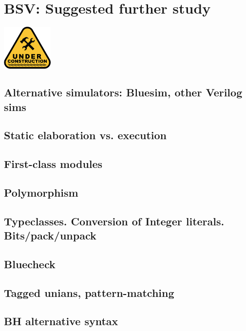 

\chapter{BSV: Suggested further study}


\setcounter{page}{1}
\renewcommand{\thepage}{\arabic{chapter}-\arabic{page}}

\label{ch_BSV_further_study}


\vspace{2ex}

\centerline{\includegraphics[width=1in,angle=0]{Figures/Fig_Under_Construction}}

\vspace{2ex}

\section{Alternative simulators: Bluesim, other Verilog sims}

\section{Static elaboration vs. execution}

\section{First-class modules}

\section{Polymorphism}

\section{Typeclasses. Conversion of Integer literals. Bits/pack/unpack}

\section{Bluecheck}

\section{Tagged unians, pattern-matching}

\section{BH alternative syntax}

